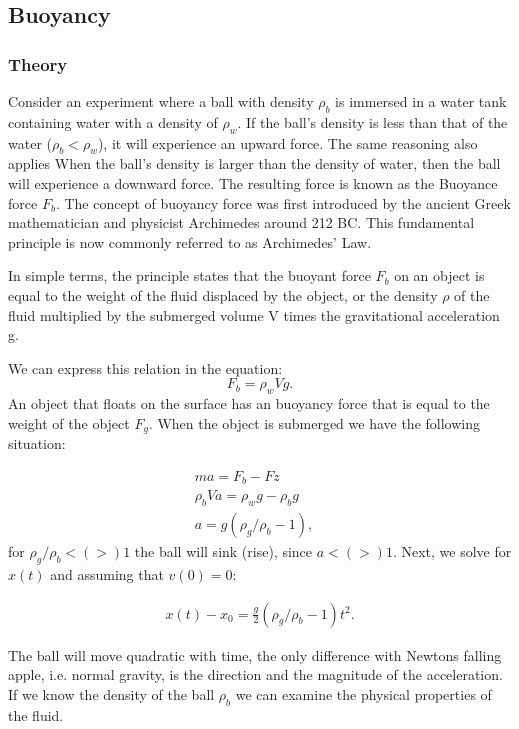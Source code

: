 \documentclass{article}
\begin{document}
\subsection{Buoyancy}
\subsubsection{Theory}
Consider an experiment where a ball with density $\rho_b$ is immersed in a water tank containing water with a density of $\rho_w$. If the ball's density is less than that of the water ($\rho_b<\rho_w$), it will experience an upward force. The same reasoning also applies When the ball's density is larger than the density of water, then the ball will experience a downward force. The resulting force is known as the Buoyance force $F_b$. The concept of buoyancy force was first introduced by the ancient Greek mathematician and physicist Archimedes around 212 BC. This fundamental principle is now commonly referred to as Archimedes' Law.

In simple terms, the principle states that the buoyant force $F_b$
on an object is equal to the weight of the fluid displaced by the object, or the density $\rho$ of the fluid multiplied by the submerged volume V times the gravitational acceleration g.

We can express this relation in the equation:
\begin{equation}
    F_b = \rho_w V g.
\end{equation}
An object that floats on the surface has an buoyancy force that is equal to the weight of the object $F_g$. When the object is submerged we have the following situation:

\begin{align}
    ma = F_b - Fz & \\
    \rho_b V a = \rho_w g -\rho_b g & \\
    a = g(\rho_g/\rho_b - 1),
\end{align}
for $\rho_g/\rho_b < (>) 1$ the ball will sink (rise), since $a<(>) 1$. Next, we solve for $x(t)$ and assuming that $v(0)=0$:

\begin{align}
    x(t)-x_0 = \frac{g}{2} \left( \rho_g/\rho_b - 1 \right)t^2.
\end{align}

The ball will move quadratic with time, the only difference with Newtons falling apple, i.e. normal gravity, is the direction and the magnitude of the acceleration. If we know the density of the ball $\rho_b$ we can examine the physical properties of the fluid.
\end{document}
